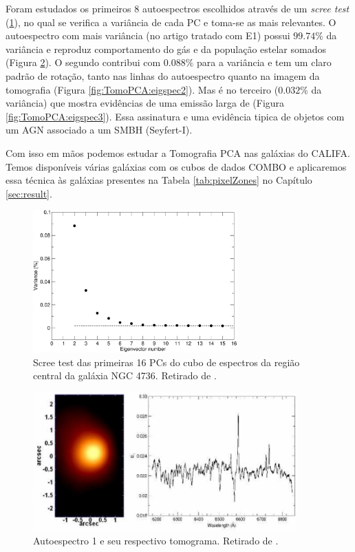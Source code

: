 Foram estudados os primeiros 8 autoespectros escolhidos através de um {\em scree
test} (\ref{fig:TomoPCA:scree}), no qual se verifica a variância de cada PC e
toma-se as mais relevantes. O autoespectro com mais variância (no artigo tratado
com E1) possui $99.74\%$ da variância e reproduz comportamento do gás e da
população estelar somados (Figura \ref{fig:TomoPCA:eigspec1}). O segundo
contribui com $0.088\%$ para a variância e tem um claro padrão de rotação, tanto
nas linhas do autoespectro quanto na imagem da tomografia (Figura
\ref{fig:TomoPCA:eigspec2}). Mas é no terceiro ($0.032\%$ da variância) que
mostra evidências de uma emissão larga de \Halpha (Figura
\ref{fig:TomoPCA:eigspec3}). Essa assinatura e uma evidência tipica de objetos
com um AGN associado a um SMBH (Seyfert-I).

Com isso em mãos podemos estudar a Tomografia PCA nas galáxias do CALIFA. Temos
disponíveis várias galáxias com os cubos de dados COMBO e aplicaremos essa
técnica às galáxias presentes na Tabela \ref{tab:pixelZones} no Capítulo
\ref{sec:result}.

\begin{figure}
    \includegraphics[width=0.7\textwidth]{figuras/figSteiner2009fig1.pdf}
    \caption[{\em Scree test} na galáxia NGC 4736.]
    {Scree test das primeiras 16 PCs do cubo de espectros da região
    central da galáxia NGC 4736. Retirado de \citet[][fig. 1]{Steiner2009}.}
    \label{fig:TomoPCA:scree}
\end{figure}

\begin{figure}
    \includegraphics[width=0.9\textwidth]{figuras/figSteiner2009figA1.pdf}
    \caption[Tomograma e autoespectro 1 da galáxia NGC 4736.]
    {Autoespectro 1 e seu respectivo tomograma. Retirado de \citet[][fig.
    A1]{Steiner2009}.}
    \label{fig:TomoPCA:eigspec1}
\end{figure}


